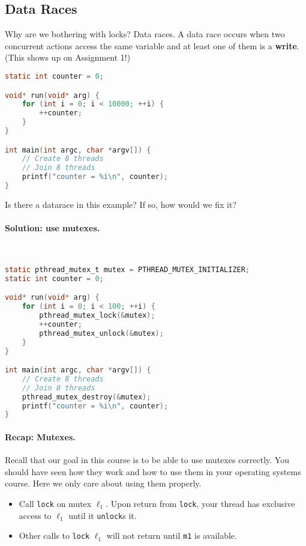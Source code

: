   \subsection*{Data Races}
  \vspace*{-1em}
Why are we bothering with locks? Data races. A data race occurs when
two concurrent actions access the same variable and at least one of
them is a {\bf write}. (This shows up on Assignment 1!)

  \begin{lstlisting}[language=C]
static int counter = 0;

void* run(void* arg) {
    for (int i = 0; i < 10000; ++i) {
        ++counter;
    }
}

int main(int argc, char *argv[]) {
    // Create 8 threads
    // Join 8 threads
    printf("counter = %i\n", counter);
}
  \end{lstlisting}

Is there a datarace in this example? If so, how would we fix it?

\paragraph{Solution: use mutexes.}~

  \begin{lstlisting}[language=C]
static pthread_mutex_t mutex = PTHREAD_MUTEX_INITIALIZER;
static int counter = 0;

void* run(void* arg) {
    for (int i = 0; i < 100; ++i) {
        pthread_mutex_lock(&mutex);
        ++counter;
        pthread_mutex_unlock(&mutex);
    }
}

int main(int argc, char *argv[]) {
    // Create 8 threads
    // Join 8 threads
    pthread_mutex_destroy(&mutex);
    printf("counter = %i\n", counter);
}
  \end{lstlisting}
  
  
\paragraph{Recap: Mutexes.} Recall that our goal in this course is
to be able to use mutexes correctly. 
You should have seen how they work and how to use them in your operating systems course. Here we only care about using them properly.

\begin{itemize}
\item Call {\tt lock} on mutex $\ell_1$. Upon return from
      {\tt lock}, your thread has exclusive access to $\ell_1$ until it
      {\tt unlock}s it.
\item Other calls to {\tt lock} $\ell_1$ will not return
      until {\tt m1} is available.
\end{itemize}

